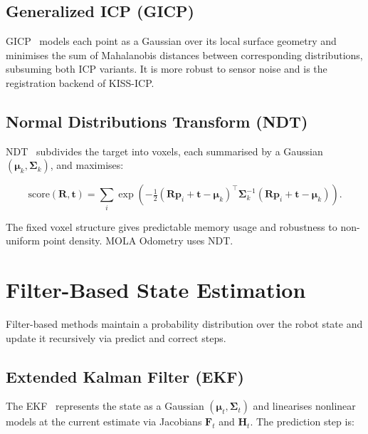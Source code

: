 \subsection{Generalized ICP (GICP)}

GICP~\cite{segal2009gicp} models each point as a Gaussian over its local
surface geometry and minimises the sum of Mahalanobis distances between
corresponding distributions, subsuming both ICP variants.
It is more robust to sensor noise and is the registration backend of KISS-ICP.

\subsection{Normal Distributions Transform (NDT)}

NDT~\cite{biber2003ndt} subdivides the target into voxels, each summarised by a
Gaussian $(\boldsymbol{\mu}_k, \boldsymbol{\Sigma}_k)$, and maximises:

\begin{equation}
  \text{score}(\mathbf{R}, \mathbf{t}) =
    \sum_i \exp\!\left(
      -\tfrac{1}{2}(\mathbf{R}\mathbf{p}_i + \mathbf{t} - \boldsymbol{\mu}_k)^\top
      \boldsymbol{\Sigma}_k^{-1}
      (\mathbf{R}\mathbf{p}_i + \mathbf{t} - \boldsymbol{\mu}_k)
    \right).
  \label{eq:ndt}
\end{equation}

\noindent The fixed voxel structure gives predictable memory usage and robustness
to non-uniform point density. MOLA Odometry uses NDT.

\section{Filter-Based State Estimation}
\label{sec:filters}

Filter-based methods maintain a probability distribution over the robot state
and update it recursively via predict and correct steps.

\subsection{Extended Kalman Filter (EKF)}

The EKF~\cite{thrun2005probabilistic} represents the state as a Gaussian
$(\boldsymbol{\mu}_t, \boldsymbol{\Sigma}_t)$ and linearises nonlinear models
at the current estimate via Jacobians $\mathbf{F}_t$ and $\mathbf{H}_t$.
The prediction step is:

